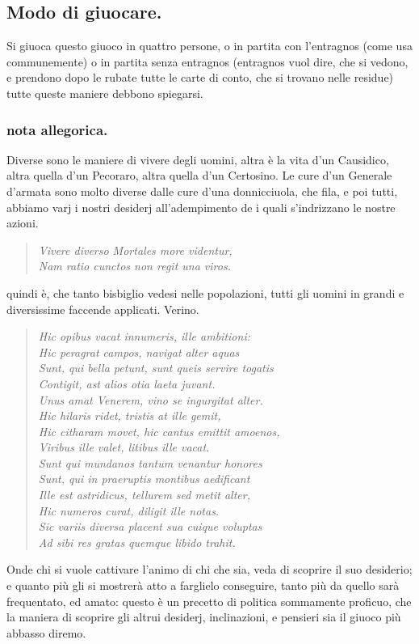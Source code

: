 \documentclass[11pt,a6paper]{article}
\newcommand{\literaryquote}[1]{%
\kern -6pt  \begin{verse}
    {\footnotesize \it #1}
  \end{verse}\kern -2pt%
}
\begin{document}
\subsection{Modo di giuocare.}

Si giuoca questo giuoco in quattro persone,
o in partita con l'entragnos (come
usa communemente) o in partita senza entragnos
(entragnos vuol dire, che si vedono, e
prendono dopo le rubate tutte le carte di
conto, che si trovano nelle residue) tutte
queste maniere debbono spiegarsi.

\subsubsection{nota allegorica.}
{\footnotesize
Diverse sono le maniere di vivere degli uomini,
altra è la vita d'un Causidico, altra quella
d'un Pecoraro, altra quella d'un Certosino. Le
cure d'un Generale d'armata sono molto diverse
dalle cure d'una donnicciuola, che fila, e poi
tutti, abbiamo varj i nostri desiderj
all'adempimento
de i quali s'indrizzano le nostre azioni.
\literaryquote{Vivere diverso Mortales more videntur, \\
Nam ratio cunctos non regit una viros.}

quindi è, che tanto bisbiglio vedesi nelle
popolazioni, tutti gli uomini in grandi e
diversissime faccende applicati. Verino.
\literaryquote{
 Hic opibus vacat innumeris, ille ambitioni: \\
Hic peragrat campos, navigat alter aquas \\
Sunt, qui bella petunt, sunt queis servire togatis\\
Contigit, ast alios otia laeta juvant. \\
Unus amat Venerem, vino se ingurgitat alter.\\
Hic hilaris ridet, tristis at ille gemit,\\
Hic citharam movet, hic cantus emittit amoenos,\\
Viribus ille valet, litibus ille vacat. \\
Sunt qui mundanos tantum venantur honores\\
Sunt, qui in praeruptis montibus aedificant \\
Ille est astridicus, tellurem sed metit alter, \\
Hic numeros curat, diligit ille notas.\\
Sic variis diversa placent sua cuique voluptas \\
Ad sibi res gratas quemque libido trahit.}

Onde chi si vuole cattivare l'animo di chi che sia,
veda di scoprire il suo desiderio; e quanto più gli si
mostrerà atto a farglielo conseguire, tanto più da
quello sarà frequentato, ed amato: questo è un
precetto di politica sommamente proficuo, che la
maniera di scoprire gli altrui desiderj, inclinazioni,
e pensieri sia il giuoco più abbasso diremo.
}
\end{document}
